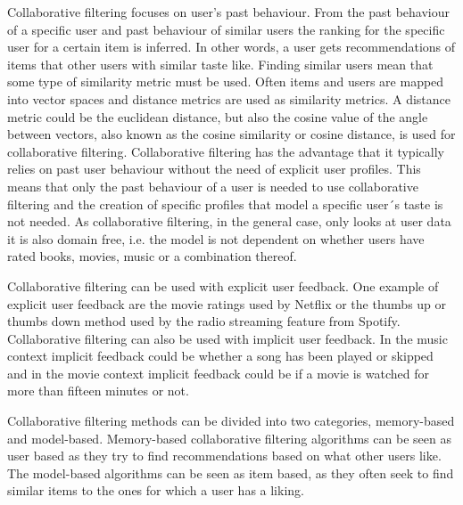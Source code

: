 \documentclass[a4paper,11pt]{kth-mag}
\begin{document}
 Collaborative filtering focuses on user's past behaviour. From the past behaviour of a specific user and past behaviour of similar users the ranking for the specific user for a certain item is inferred\cite{sarwar2001item}\cite{su2009survey}. In other words, a user gets recommendations of items that other users with similar taste like\cite{adomavicius2005toward}. Finding similar users mean that some type of similarity metric must be used. Often items and users are mapped into vector spaces and distance metrics are used as similarity metrics. A distance metric could be the euclidean distance, but also the cosine value of the angle between vectors, also known as the cosine similarity or cosine distance, is used for collaborative filtering\cite{sarwar2001item}. 
 Collaborative filtering has the advantage that it typically relies on past user behaviour without the need of explicit user profiles\cite{melville2002content}. This means that only the past behaviour of a user is needed to use collaborative filtering and the creation of specific profiles that model a specific user´s taste is not needed.  As collaborative filtering, in the general case, only looks at user data it is also domain free, i.e. the model is not dependent on whether users have rated books, movies, music or a combination thereof\cite{hu2008collaborative}.

Collaborative filtering can be used with explicit user feedback. One example of explicit user feedback are the movie ratings used by Netflix or the thumbs up or thumbs down method used by the radio streaming feature from Spotify. Collaborative filtering can also be used with implicit user feedback\cite{hu2008collaborative}. In the music context implicit feedback could be whether a song has been played or skipped and in the movie context implicit feedback could be if a movie is watched for more than fifteen minutes or not.

Collaborative filtering methods can be divided into two categories, memory-based and model-based. Memory-based collaborative filtering algorithms can be seen as user based as they try to find recommendations based on what other users like. The model-based algorithms can be seen as item based, as they often seek to find similar items to the ones for which a user has a liking\cite{sarwar2001item}.
\end{document}
